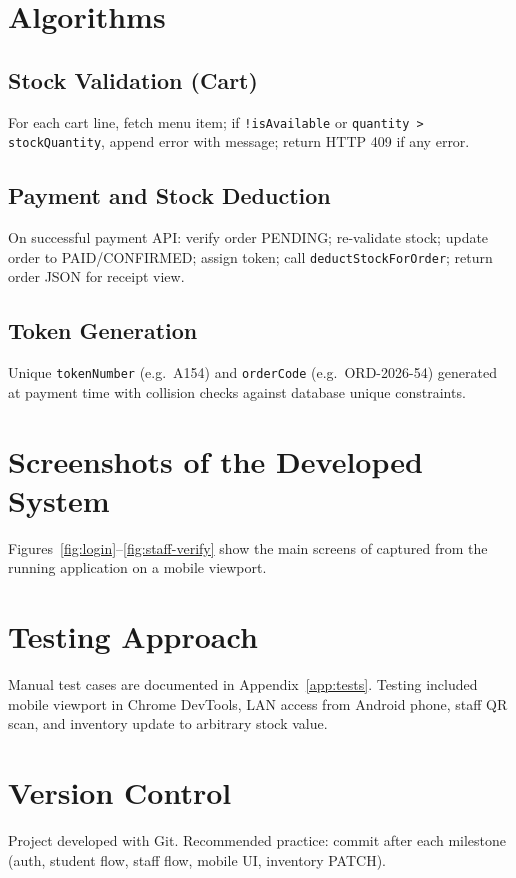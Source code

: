 \section{Algorithms}

\subsection{Stock Validation (Cart)}
For each cart line, fetch menu item; if \texttt{!isAvailable} or \texttt{quantity > stockQuantity}, append error with message; return HTTP 409 if any error.

\subsection{Payment and Stock Deduction}
On successful payment API: verify order PENDING; re-validate stock; update order to PAID/CONFIRMED; assign token; call \texttt{deductStockForOrder}; return order JSON for receipt view.

\subsection{Token Generation}
Unique \texttt{tokenNumber} (e.g.\ A154) and \texttt{orderCode} (e.g.\ ORD-2026-54) generated at payment time with collision checks against database unique constraints.

\section{Screenshots of the Developed System}
\label{sec:ui-screenshots}
Figures~\ref{fig:login}--\ref{fig:staff-verify} show the main screens of \ShortTitle{} captured from the running application on a mobile viewport.



\section{Testing Approach}
Manual test cases are documented in Appendix~\ref{app:tests}. Testing included mobile viewport in Chrome DevTools, LAN access from Android phone, staff QR scan, and inventory update to arbitrary stock value.

\section{Version Control}
Project developed with Git. Recommended practice: commit after each milestone (auth, student flow, staff flow, mobile UI, inventory PATCH).
